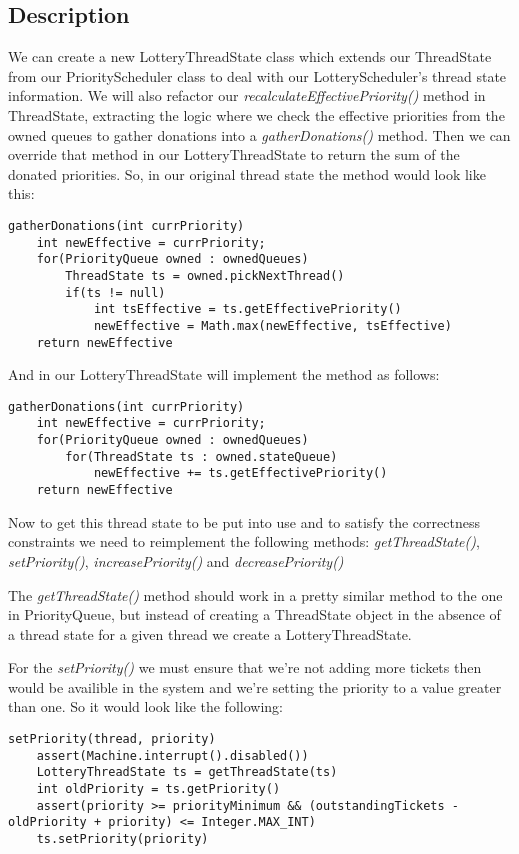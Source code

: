 \documentclass{article}
\begin{document}
\subsection*{Description}

We can create a new LotteryThreadState class which extends our ThreadState from our PriorityScheduler class to deal
with our LotteryScheduler's thread state information. We will also refactor our \textit{recalculateEffectivePriority()}
method in ThreadState, extracting the logic where we check the effective priorities from the owned queues to gather
donations into a \textit{gatherDonations()} method. Then we can override that method in our LotteryThreadState to
return the sum of the donated priorities. So, in our original thread state the method would look like this:
\begin{verbatim}
gatherDonations(int currPriority)
    int newEffective = currPriority;
    for(PriorityQueue owned : ownedQueues)
        ThreadState ts = owned.pickNextThread()
        if(ts != null)
            int tsEffective = ts.getEffectivePriority()
            newEffective = Math.max(newEffective, tsEffective)
    return newEffective
\end{verbatim}
And in our LotteryThreadState will implement the method as follows:
\begin{verbatim}
gatherDonations(int currPriority)
    int newEffective = currPriority;
    for(PriorityQueue owned : ownedQueues)
        for(ThreadState ts : owned.stateQueue)
            newEffective += ts.getEffectivePriority()
    return newEffective
\end{verbatim}

Now to get this thread state to be put into use and to satisfy the correctness constraints we need to reimplement
the following methods: \textit{getThreadState()}, \textit{setPriority()}, \textit{increasePriority()} and
\textit{decreasePriority()}

The \textit{getThreadState()} method should work in a pretty similar method to the one in PriorityQueue, but instead
of creating a ThreadState object in the absence of a thread state for a given thread we create a LotteryThreadState.

For the \textit{setPriority()} we must ensure that we're not adding more tickets then would be availible in the 
system and we're setting the priority to a value greater than one. So it would look like the following:
\begin{verbatim}
setPriority(thread, priority)
    assert(Machine.interrupt().disabled())
    LotteryThreadState ts = getThreadState(ts)
    int oldPriority = ts.getPriority()
    assert(priority >= priorityMinimum && (outstandingTickets - oldPriority + priority) <= Integer.MAX_INT)
    ts.setPriority(priority)
\end{verbatim}
\end{document}
